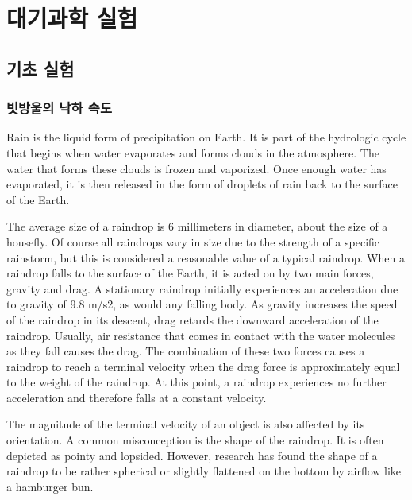 
\part{대기과학 실험}



\chapter{기초 실험}

\section{빗방울의 낙하 속도}

Rain is the liquid form of precipitation on Earth. It is part of the hydrologic cycle that begins when water evaporates and forms clouds in the atmosphere. The water that forms these clouds is frozen and vaporized. Once enough water has evaporated, it is then released in the form of droplets of rain back to the surface of the Earth.

The average size of a raindrop is 6 millimeters in diameter, about the size of a housefly. Of course all raindrops vary in size due to the strength of a specific rainstorm, but this is considered a reasonable value of a typical raindrop. When a raindrop falls to the surface of the Earth, it is acted on by two main forces, gravity and drag. A stationary raindrop initially experiences an acceleration due to gravity of 9.8 m/s2, as would any falling body. As gravity increases the speed of the raindrop in its descent, drag retards the downward acceleration of the raindrop. Usually, air resistance that comes in contact with the water molecules as they fall causes the drag. The combination of these two forces causes a raindrop to reach a terminal velocity when the drag force is approximately equal to the weight of the raindrop. At this point, a raindrop experiences no further acceleration and therefore falls at a constant velocity.

The magnitude of the terminal velocity of an object is also affected by its orientation. A common misconception is the shape of the raindrop. It is often depicted as pointy and lopsided. However, research has found the shape of a raindrop to be rather spherical or slightly flattened on the bottom by airflow like a hamburger bun.

